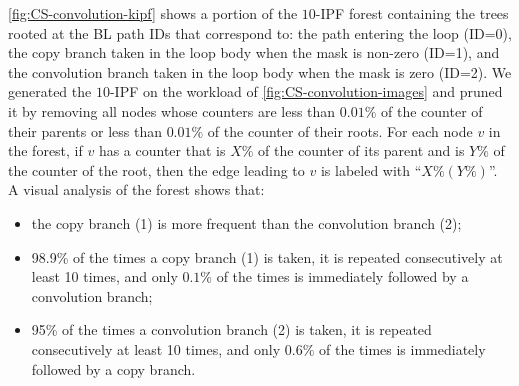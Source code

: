 \myfigure\ref{fig:CS-convolution-kipf} shows a portion of the $10$-IPF forest containing the trees rooted at the BL path IDs that correspond to: the path entering the loop (ID=0), the copy branch taken in the loop body when the mask is non-zero (ID=1), and the convolution branch taken in the loop body when the mask is zero (ID=2). We generated the $10$-IPF on the workload of \myfigure\ref{fig:CS-convolution-images} and pruned it by removing all nodes whose counters are less than $0.01\%$ of the counter of their parents or less than $0.01\%$ of the counter of their roots. For each node $v$ in the forest, if $v$ has a counter that is $X\%$ of the counter of its parent and is $Y\%$ of the counter of the root, then the edge leading to $v$ is labeled with ``$X\% (Y\%)$''. A visual analysis of the forest shows that:
\begin{itemize}[itemsep=0pt,parsep=3pt]
\item the copy branch (1) is more frequent than the convolution branch (2);
\item 98.9\% of the times a copy branch (1) is taken, it is repeated consecutively at least 10 times, and only $0.1\%$ of the times is immediately followed by a convolution branch;
\item 95\% of the times a convolution branch (2) is taken, it is repeated consecutively at least 10 times, and only $0.6\%$ of the times is immediately followed by a copy branch.
\end{itemize}


